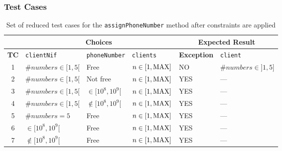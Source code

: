 \subsubsection{Test Cases}
\label{sec:methods.assignPhoneNumber.tests}
\begin{table}[!hbtp]
  \centering
  \normalsize
  \begin{tabular}{|c|*{5}{l|}}
    \cline{2-6}
    \multicolumn{1}{c|}{}
      & \multicolumn{3}{c|}{\textbf{Choices}}
      & \multicolumn{2}{c|}{\textbf{Expected Result}} \\
    \hline
    \textbf{TC}
      & \texttt{clientNif} & \texttt{phoneNumber} & \texttt{clients}
      & \textbf{Exception} & \texttt{client} \\
    \hline
    1 & $\#numbers \in [1,5[$ & Free & $n \in [1,\rm{MAX}]$
      & NO & $\#numbers \in ]1,5]$ \\ \hline
    2 & $\#numbers \in [1,5[$ & Not free & $n \in [1,\rm{MAX}]$
      & YES & --- \\ \hline
    3 & $\#numbers \in [1,5[$ & $\in [10^8,10^9[$ & $n \in [1,\rm{MAX}]$
      & YES & --- \\ \hline
    4 & $\#numbers \in [1,5[$ & $\notin [10^8,10^9[$ & $n \in [1,\rm{MAX}]$
      & YES & --- \\ \hline
    5 & $\#numbers = 5$ & Free & $n \in [1,\rm{MAX}]$
      & YES & --- \\ \hline
    6 & $\in [10^8,10^9[$ & Free & $n \in [1,\rm{MAX}]$
      & YES & --- \\ \hline
    7 & $\notin [10^8,10^9[$ & Free & $n \in [1,\rm{MAX}]$
      & YES & --- \\ \hline
  \end{tabular}
  \caption[\texttt{assignPhoneNumber} test cases]
    {Set of reduced test cases for the \texttt{assignPhoneNumber} method after
      constraints are applied}
  \label{tab:methods.assignPhoneNumber.tests}
\end{table}